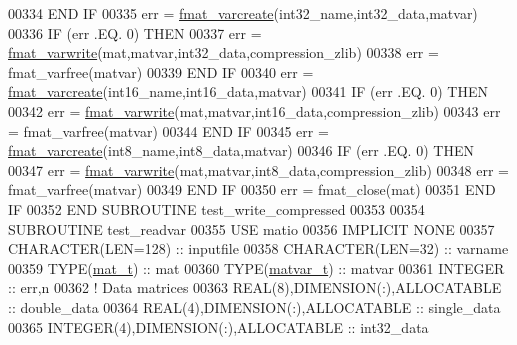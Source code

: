 \begin{DoxyCode}
{00334 \textcolor{keywordflow}{            END IF}
00335             err = \hyperlink{interfacematio_1_1fmat__varcreate}{fmat\_varcreate}(int32\_name,int32\_data,matvar)
00336             \textcolor{keywordflow}{IF} (err .EQ. 0) \textcolor{keywordflow}{THEN}
00337                 err = \hyperlink{interfacematio_1_1fmat__varwrite}{fmat\_varwrite}(mat,matvar,int32\_data,compression\_zlib)
00338                 err = fmat\_varfree(matvar)
00339 \textcolor{keywordflow}{            END IF}
00340             err = \hyperlink{interfacematio_1_1fmat__varcreate}{fmat\_varcreate}(int16\_name,int16\_data,matvar)
00341             \textcolor{keywordflow}{IF} (err .EQ. 0) \textcolor{keywordflow}{THEN}
00342                 err = \hyperlink{interfacematio_1_1fmat__varwrite}{fmat\_varwrite}(mat,matvar,int16\_data,compression\_zlib)
00343                 err = fmat\_varfree(matvar)
00344 \textcolor{keywordflow}{            END IF}
00345             err = \hyperlink{interfacematio_1_1fmat__varcreate}{fmat\_varcreate}(int8\_name,int8\_data,matvar)
00346             \textcolor{keywordflow}{IF} (err .EQ. 0) \textcolor{keywordflow}{THEN}
00347                 err = \hyperlink{interfacematio_1_1fmat__varwrite}{fmat\_varwrite}(mat,matvar,int8\_data,compression\_zlib)
00348                 err = fmat\_varfree(matvar)
00349 \textcolor{keywordflow}{            END IF}
00350             err = fmat\_close(mat)
00351 \textcolor{keywordflow}{        END IF}
00352 \textcolor{keyword}{    END SUBROUTINE }test\_write\_compressed
00353 
00354 \textcolor{keyword}{    SUBROUTINE }test\_readvar
00355     \textcolor{keywordtype}{USE }matio
00356     \textcolor{keywordtype}{IMPLICIT NONE}
00357         \textcolor{keywordtype}{CHARACTER(LEN=128)} :: inputfile
00358         \textcolor{keywordtype}{CHARACTER(LEN=32)}  :: varname
00359         \textcolor{keywordtype}{TYPE}(\hyperlink{group___m_a_t_gab0fc888f5a5d79943b16284b1f91c2e8}{mat\_t})        :: mat
00360         \textcolor{keywordtype}{TYPE}(\hyperlink{group___m_a_t_structmatvar__t}{matvar\_t})     :: matvar
00361         \textcolor{keywordtype}{INTEGER}            :: err,n
00362         \textcolor{comment}{! Data matrices}
00363         \textcolor{keywordtype}{REAL(8)},\textcolor{keywordtype}{DIMENSION(:)},\textcolor{keywordtype}{ALLOCATABLE}      :: double\_data
00364         \textcolor{keywordtype}{REAL(4)},\textcolor{keywordtype}{DIMENSION(:)},\textcolor{keywordtype}{ALLOCATABLE}      :: single\_data
00365         \textcolor{keywordtype}{INTEGER(4)},\textcolor{keywordtype}{DIMENSION(:)},\textcolor{keywordtype}{ALLOCATABLE}   :: int32\_data
}
\end{DoxyCode}
